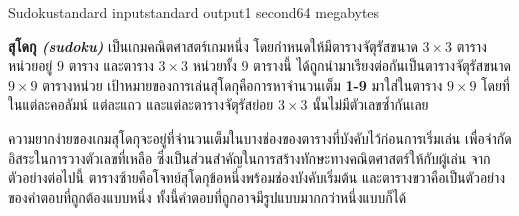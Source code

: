 \documentclass[11pt,a4paper]{article}
\begin{document}
\begin{problem}{Sudoku}{standard input}{standard output}{1 second}{64 megabytes}

\textbf{สุโดกุ \textit{(sudoku)}} เป็นเกมคณิตศาสตร์เกมหนึ่ง โดยกำหนดให้มีตารางจัตุรัสขนาด $3 \times 3$ ตารางหน่วยอยู่ $9$ ตาราง และตาราง $3 \times 3$ หน่วยทั้ง $9$ ตารางนี้ ได้ถูกนำมาเรียงต่อกันเป็นตารางจัตุรัสขนาด $9 \times 9$ ตารางหน่วย เป้าหมายของการเล่นสุโดกุคือการหาจำนวนเต็ม \textbf{1-9 }มาใส่ในตาราง $9 \times 9$ โดยที่ในแต่ละคอลัมน์ แต่ละแถว และแต่ละตารางจัตุรัสย่อย $3 \times 3$ นั้นไม่มีตัวเลขซ้ำกันเลย

ความยากง่ายของเกมสุโดกุจะอยู่ที่จำนวนเต็มในบางช่องของตารางที่บังคับไว้ก่อนการเริ่มเล่น เพื่อจำกัดอิสระในการวางตัวเลขที่เหลือ ซึ่งเป็นส่วนสำคัญในการสร้างทักษะทางคณิตศาสตร์ให้กับผู้เล่น จากตัวอย่างต่อไปนี้ ตารางซ้ายคือโจทย์สุโดกุข้อหนึ่งพร้อมช่องบังคับเริ่มต้น และตารางขวาคือเป็นตัวอย่างของคำตอบที่ถูกต้องแบบหนึ่ง ทั้งนี้คำตอบที่ถูกอาจมีรูปแบบมากกว่าหนึ่งแบบก็ได้
\bigskip


\end{problem}
\end{document}
